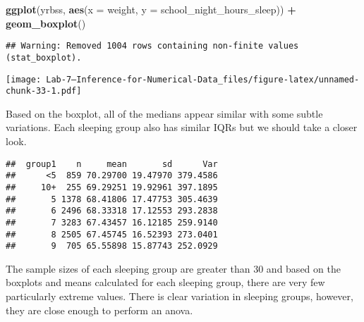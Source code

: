 \documentclass[
]{article}
\newenvironment{Shaded}{\begin{snugshade}}{\end{snugshade}}
\newcommand{\DataTypeTok}[1]{\textcolor[rgb]{0.13,0.29,0.53}{#1}}
\newcommand{\DecValTok}[1]{\textcolor[rgb]{0.00,0.00,0.81}{#1}}
\newcommand{\KeywordTok}[1]{\textcolor[rgb]{0.13,0.29,0.53}{\textbf{#1}}}
\newcommand{\NormalTok}[1]{#1}
\newcommand{\OperatorTok}[1]{\textcolor[rgb]{0.81,0.36,0.00}{\textbf{#1}}}
\newcommand{\OtherTok}[1]{\textcolor[rgb]{0.56,0.35,0.01}{#1}}
\newcommand{\StringTok}[1]{\textcolor[rgb]{0.31,0.60,0.02}{#1}}
\begin{document}
\begin{Shaded}
\begin{Highlighting}[]
\KeywordTok{ggplot}\NormalTok{(yrbss, }\KeywordTok{aes}\NormalTok{(}\DataTypeTok{x =}\NormalTok{ weight, }\DataTypeTok{y =}\NormalTok{ school_night_hours_sleep)) }\OperatorTok{+}\StringTok{ }\KeywordTok{geom_boxplot}\NormalTok{()}
\end{Highlighting}
\end{Shaded}

\begin{verbatim}
## Warning: Removed 1004 rows containing non-finite values (stat_boxplot).
\end{verbatim}

\texttt{[image: Lab-7---Inference-for-Numerical-Data\_files/figure-latex/unnamed-chunk-33-1.pdf]}

Based on the boxplot, all of the medians appear similar with some subtle
variations. Each sleeping group also has similar IQRs but we should take
a closer look.

\begin{Shaded}
\end{Shaded}

\begin{verbatim}
##  group1    n     mean       sd      Var
##      <5  859 70.29700 19.47970 379.4586
##     10+  255 69.29251 19.92961 397.1895
##       5 1378 68.41806 17.47753 305.4639
##       6 2496 68.33318 17.12553 293.2838
##       7 3283 67.43457 16.12185 259.9140
##       8 2505 67.45745 16.52393 273.0401
##       9  705 65.55898 15.87743 252.0929
\end{verbatim}

The sample sizes of each sleeping group are greater than 30 and based on
the boxplots and means calculated for each sleeping group, there are
very few particularly extreme values. There is clear variation in
sleeping groups, however, they are close enough to perform an anova.
\end{document}
